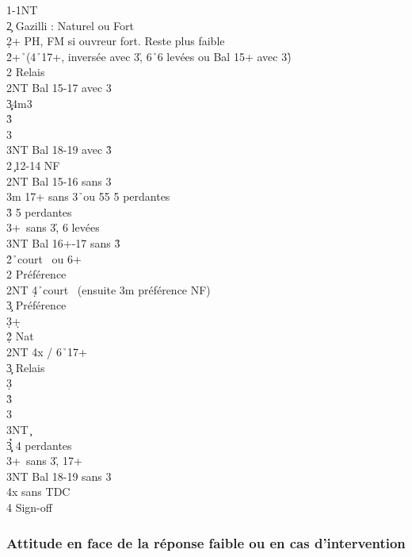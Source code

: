 \documentclass[a4paper]{article}
\begin{document}
\begin{bidtable}
1\s-1NT\\
2\c \> Gazilli : Naturel ou Fort\+\\
2\d {}+ PH, FM si ouvreur fort. Reste plus faible\+\\
2\h {}+\h\ (4\h\ 17+, inversée avec 3\h , 6\h\ 6 levées ou Bal 15+ avec 3\h )\+\\
2\s \> Relais\+\\
2NT \> Bal 15-17 avec 3\h \\
3\c\d {}\s 4m3\h \\
3\h {}\h \\
3\s {}\h \\
3NT \> Bal 18-19 avec 3\h \-\-\\
2\s {}\c\ 12-14 NF\\
2NT \> Bal 15-16 sans 3\h \\
3m  17+ sans 3\h\ ou 55 5 perdantes\\
3\h {} 5 perdantes\\
3\s {}+\s\ sans 3\h , 6 levées\\
3NT \> Bal 16+-17 sans 3\h \-\\
2\h {}\h\ court \s\ ou 6+\h \\
2\s \> Préférence\\
2NT \d 4\h\ court \s\ (ensuite 3m préférence NF)\\
3\c \> Préférence\\
3\d {}+\d \-\\
2\d\h\s \> Nat\\
2NT \s 4x / 6\h\ 17+\+\\
3\c \> Relais\+\\
3\d {}\d \\
3\h {}\h \\
3\s {}\h \\
3NT \c \-\-\\
3\c\d\h {} 4 perdantes\\
3\s {}+\s\ sans 3\h , 17+\\
3NT \> Bal 18-19 sans 3\h \\
4x  sans TDC\\
4\s \> Sign-off
\end{bidtable}

\subsubsection{Attitude en face de la réponse faible ou en cas d'intervention}
\end{document}
